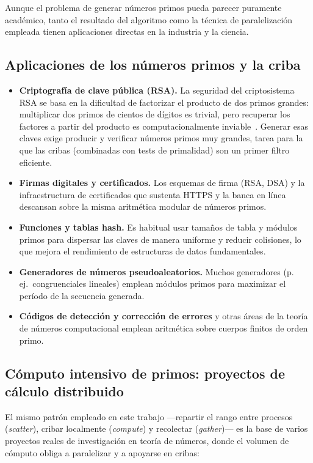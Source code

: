 \documentclass[conference]{IEEEtran}
\begin{document}
Aunque el problema de generar números primos pueda parecer puramente
académico, tanto el resultado del algoritmo como la técnica de paralelización
empleada tienen aplicaciones directas en la industria y la ciencia.

\subsection{Aplicaciones de los números primos y la criba}

\begin{itemize}
  \item \textbf{Criptografía de clave pública (RSA).} La seguridad del
        criptosistema RSA se basa en la dificultad de factorizar el producto de
        dos primos grandes: multiplicar dos primos de cientos de dígitos es
        trivial, pero recuperar los factores a partir del producto es
        computacionalmente inviable~\cite{knuth1997}. Generar esas claves exige
        producir y verificar números primos muy grandes, tarea para la que las
        cribas (combinadas con tests de primalidad) son un primer filtro
        eficiente.
  \item \textbf{Firmas digitales y certificados.} Los esquemas de firma
        (RSA, DSA) y la infraestructura de certificados que sustenta HTTPS y la
        banca en línea descansan sobre la misma aritmética modular de números
        primos.
  \item \textbf{Funciones y tablas hash.} Es habitual usar tamaños de tabla y
        módulos primos para dispersar las claves de manera uniforme y reducir
        colisiones, lo que mejora el rendimiento de estructuras de datos
        fundamentales.
  \item \textbf{Generadores de números pseudoaleatorios.} Muchos generadores
        (p.\,ej.\ congruenciales lineales) emplean módulos primos para
        maximizar el período de la secuencia generada.
  \item \textbf{Códigos de detección y corrección de errores} y otras áreas de
        la teoría de números computacional emplean aritmética sobre cuerpos
        finitos de orden primo.
\end{itemize}

\subsection{Cómputo intensivo de primos: proyectos de cálculo distribuido}

El mismo patrón empleado en este trabajo —repartir el rango entre procesos
(\textit{scatter}), cribar localmente (\textit{compute}) y recolectar
(\textit{gather})— es la base de varios proyectos reales de investigación en
teoría de números, donde el volumen de cómputo obliga a paralelizar y a apoyarse
en cribas:
\end{document}
